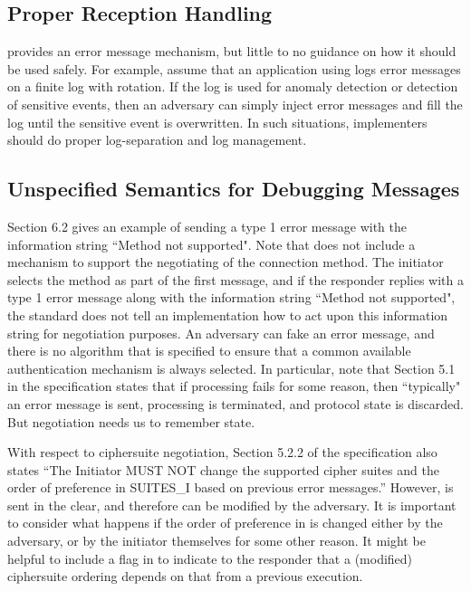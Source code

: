 \documentclass[runningheads]{llncs}
\begin{document}
\subsection{Proper Reception Handling}
\mEdhoc{} provides an error message mechanism, but little to no guidance on
how it should be used safely.
%
For example, assume that an application using \mEdhoc{} logs error messages
on a finite log with rotation.
%
If the log is used for anomaly detection or detection of sensitive events, then
an adversary can simply inject error messages and fill the log until the
sensitive event is overwritten.
%
In such situations, implementers should do proper log-separation and log
management.

\subsection{Unspecified Semantics for Debugging Messages}
Section 6.2 gives an example of sending a type 1 error message with the
information string ``Method not supported".
%
Note that \mEdhoc{} does not include a mechanism to support the
negotiating of the connection method.
%
The initiator selects the method as part of the first message, and if the
responder replies with a type 1 error message along with the information
string ``Method not supported", the standard does not tell an
implementation how to act upon this information string for negotiation
purposes.
%
An adversary can fake an error message, and there is no algorithm that is
specified to ensure that a common available authentication mechanism is
always selected.
%
In particular, note that Section 5.1 in the specification states that if processing
fails for some reason, then ``typically" an error message is sent, processing is
terminated, and protocol state is discarded.
%
But negotiation needs us to remember state.

With respect to ciphersuite negotiation, Section 5.2.2 of the specification also
states ``The Initiator MUST NOT change the supported cipher suites and
the order of preference in SUITES\_I based on previous error messages.''
%
However, \mSuites{} is sent in the clear, and therefore can be modified by the
adversary.
%
It is important to consider what happens if the order of preference in
\mSuites{} is changed either by the adversary, or by the initiator themselves
for some other reason.
%
It might be helpful to include a flag in \mMsgone{} to indicate to the
responder
that a (modified) ciphersuite ordering depends on that from a previous
execution.
\end{document}
